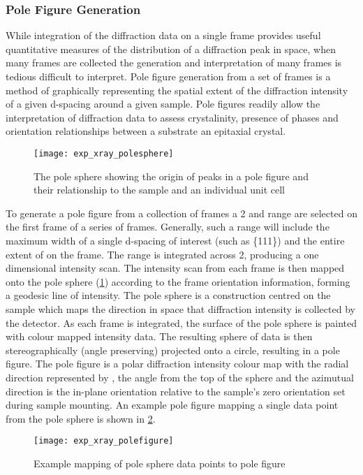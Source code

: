 \subsubsection{Pole Figure Generation}
While integration of the diffraction data on a single frame provides useful quantitative measures of the distribution of a diffraction peak in space, when many frames are collected the generation and interpretation of many frames is tedious difficult to interpret. Pole figure generation from a set of frames is a method of graphically representing the spatial extent of the diffraction intensity of a given d-spacing around a given sample. Pole figures readily allow the interpretation of diffraction data to assess crystalinity, presence of phases and orientation relationships between a substrate an epitaxial crystal.
\begin{figure}
    \centering
    \texttt{[image: exp\_xray\_polesphere]}
    \caption[Mapping of a unit cell to pole sphere]{\label{fig:exp_xray_polesphere}The pole sphere showing the origin of peaks in a pole figure and their relationship to the sample and an individual unit cell\cite{gadds_manual}}
\end{figure}

To generate a pole figure from a collection of frames a 2\texttheta{} and \textchi{} range are selected on the first frame of a series of frames. Generally, such a range will include the maximum width of a single d-spacing of interest (such as \{111\}) and the entire extent of \textchi{} on the frame. The range is integrated across 2\texttheta{}, producing a one dimensional intensity scan. The intensity scan from each frame is then mapped onto the pole sphere (\cref{fig:exp_xray_polesphere}) according to the frame orientation information, forming a geodesic line of intensity. The pole sphere is a construction centred on the sample which maps the direction in space that diffraction intensity is collected by the detector. As each frame is integrated, the surface of the pole sphere is painted with colour mapped intensity data. The resulting sphere of data is then stereographically (angle preserving) projected onto a circle, resulting in a pole figure. The pole figure is a polar diffraction intensity colour map with the radial direction represented by \textalpha{}, the angle from the top of the sphere and the azimutual direction \textphi{} is the in-plane orientation relative to the sample's \textphi{} zero orientation set during sample mounting. An example pole figure mapping a single data point from the pole sphere is shown in \cref{fig:exp_xray_polefigure}. 
\begin{figure}
    \centering
    \texttt{[image: exp\_xray\_polefigure]}
    \caption[Mapping of pole sphere to pole figure]{\label{fig:exp_xray_polefigure}Example mapping of pole sphere data points to pole figure\cite{bobhe}}
\end{figure}

